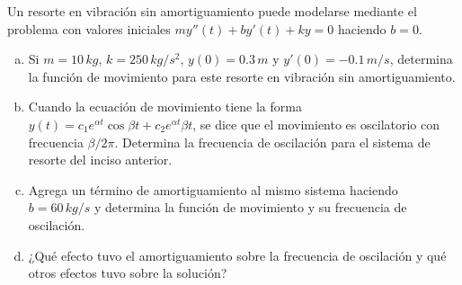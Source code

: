 \documentclass[12pt]{exam}
\begin{document}
\begin{questions}
     

     \question%
     Un resorte en vibración sin amortiguamiento puede modelarse mediante el problema con valores iniciales $my''(t)+by'(t)+ky=0$ haciendo $b=0$.
     \begin{enumerate}[a)]
         \item Si $m=10\, kg$, $k=250\,kg/s^2$, $y(0)=0.3\,m$ y $y'(0)=-0.1\,m/s$, determina la función de movimiento para este resorte en vibración sin amortiguamiento.
         \item Cuando la ecuación de movimiento tiene la forma $y(t)=c_1e^{\alpha t}\cos\beta t+c_2e^{\alpha t}\beta t$, se dice que el movimiento es oscilatorio con frecuencia $\beta/2\pi$. Determina la frecuencia de oscilación para el sistema de resorte del inciso anterior.
         \item Agrega un término de amortiguamiento al mismo sistema haciendo $b=60\,kg/s$ y determina la función de movimiento y su frecuencia de oscilación.
         \item ¿Qué efecto tuvo el amortiguamiento sobre la frecuencia de oscilación y qué otros efectos tuvo sobre la solución?
     \end{enumerate}
    

     

     
     
        \end{questions}
        \vskip30pt
 
 
    




\pagestyle{foot}    %



\end{document}
